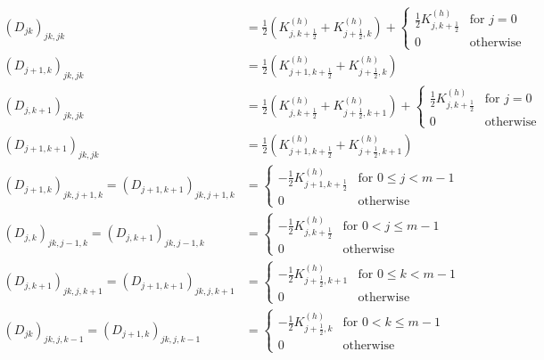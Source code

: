 \documentclass[11pt]{article}
\begin{document}
\begin{equation}
    \begin{aligned}
    (D_{jk})_{jk,jk} &= \frac{1}{2}\left(K^{(h)}_{j,k+\frac{1}{2}}+K^{(h)}_{j+\frac{1}{2},k}\right) +
    \begin{cases}
    \frac{1}{2}K^{(h)}_{j,k+\frac{1}{2}} & \text{for $j=0$}\\
    0 & \text{otherwise}
    \end{cases}\\
    (D_{j+1,k})_{jk,jk} &= \frac{1}{2}\left(K^{(h)}_{j+1,k+\frac{1}{2}}+K^{(h)}_{j+\frac{1}{2},k}\right)\\
    (D_{j,k+1})_{jk,jk} &= \frac{1}{2}\left(K^{(h)}_{j,k+\frac{1}{2}}+K^{(h)}_{j+\frac{1}{2},k+1}\right) +
    \begin{cases}
    \frac{1}{2}K^{(h)}_{j,k+\frac{1}{2}} & \text{for $j=0$}\\
    0 & \text{otherwise}
    \end{cases}\\
    (D_{j+1,k+1})_{jk,jk} &= \frac{1}{2}\left(K^{(h)}_{j+1,k+\frac{1}{2}}+K^{(h)}_{j+\frac{1}{2},k+1}\right)\\
    (D_{j+1,k})_{jk,j+1,k} = (D_{j+1,k+1})_{jk,j+1,k} &= \begin{cases}
        -\frac{1}{2}K^{(h)}_{j+1,k+\frac{1}{2}} & \text{for $0\le j<m-1$}\\
        0 & \text{otherwise}
    \end{cases}\\
    (D_{j,k})_{jk,j-1,k} = (D_{j,k+1})_{jk,j-1,k} &= \begin{cases}
        -\frac{1}{2}K^{(h)}_{j,k+\frac{1}{2}} & \text{for $0< j\le m-1$}\\
        0 & \text{otherwise}
    \end{cases}\\
    (D_{j,k+1})_{jk,j,k+1} = (D_{j+1,k+1})_{jk,j,k+1} &= \begin{cases}
        -\frac{1}{2}K^{(h)}_{j+\frac{1}{2},k+1} & \text{for $0\le k< m-1$}\\
        0 & \text{otherwise}
    \end{cases}\\
    (D_{jk})_{jk,j,k-1} = (D_{j+1,k})_{jk,j,k-1} &= \begin{cases}
        -\frac{1}{2}K^{(h)}_{j+\frac{1}{2},k} & \text{for $0< k\le m-1$}\\
        0 & \text{otherwise}
    \end{cases}
    \end{aligned}
\end{equation}
\end{document}
